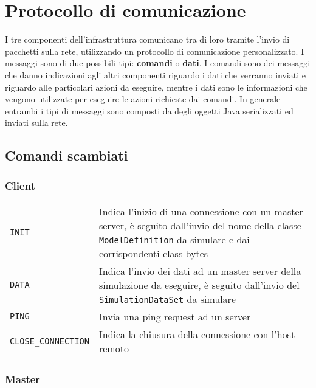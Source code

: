 
\section{Protocollo di comunicazione}

I tre componenti dell'infrastruttura comunicano tra di loro tramite l'invio di pacchetti sulla rete, utilizzando un protocollo di comunicazione personalizzato. 
I messaggi sono di due possibili tipi: \textbf{comandi} o \textbf{dati}. I comandi sono dei messaggi che danno indicazioni agli altri componenti riguardo i dati che verranno inviati e riguardo alle particolari azioni da eseguire, mentre i dati sono le informazioni che vengono utilizzate per eseguire le azioni richieste dai comandi. In generale entrambi i tipi di messaggi sono composti da degli oggetti Java serializzati ed inviati sulla rete.

\subsection{Comandi scambiati}

\subsubsection{Client}

\begin{table}[H]
    \begin{tabularx}{\linewidth}{ l X }
       \texttt{INIT}             & Indica l'inizio di una connessione con un master server, è seguito dall'invio del nome della classe \texttt{ModelDefinition} da simulare e dai corrispondenti class bytes \\
       \texttt{DATA}             & Indica l'invio dei dati ad un master server della simulazione da eseguire, è seguito dall'invio del \texttt{SimulationDataSet} da simulare \\
       \texttt{PING}             & Invia una ping request ad un server \\
       \texttt{CLOSE\_CONNECTION} & Indica la chiusura della connessione con l'host remoto
    \end{tabularx}
\end{table}

\subsubsection{Master}


